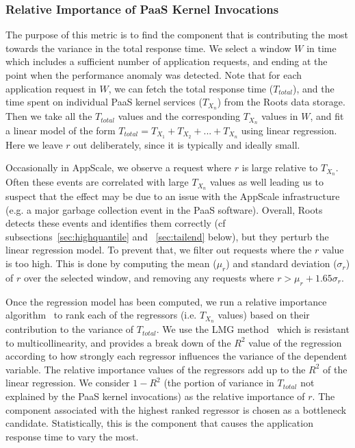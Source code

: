 \subsubsection{Relative Importance of PaaS Kernel Invocations} 
The purpose of this metric is to find the component that is contributing 
the most towards the variance in the total response time. 
We select a window $W$ in time which includes a sufficient number of application requests,
and ending at the point when the performance anomaly was detected. Note that for each application request
in $W$, we can fetch the total response time ($T_{total}$), and the time spent on individual PaaS kernel
services ($T_{X_n}$) from the Roots data storage.
Then we take all the $T_{total}$ values
and the corresponding $T_{X_n}$ values in $W$, and fit 
a linear model of the form 
$T_{total} = T_{X_1} + T_{X_2} + ... + T_{X_n}$
using linear regression. Here we leave $r$ out
deliberately, since it is typically and ideally small. 

Occasionally in AppScale, we observe a request where $r$ is
large relative to $T_{X_n}$.  Often these events are correlated with large
$T_{X_n}$ values as well leading us to suspect that the effect may be due to
an issue with the AppScale infrastructure (e.g. a major garbage collection
event in the PaaS software).  Overall, Roots detects these events and identifies them correctly (cf
subsections~\ref{sec:highquantile} and ~\ref{sec:tailend} below), but they
perturb the linear regression model.  To prevent that,
we filter out requests where the $r$ value is too high. This
is done by computing the mean ($\mu_r$) and standard deviation ($\sigma_r$) of $r$ 
over the selected window, and removing 
any requests where $r > \mu_r + 1.65\sigma_r$.

Once the regression model has been computed, we run a relative importance algorithm~\cite{JSSv017i01} to rank each of the
regressors (i.e. $T_{X_n}$ values) based on their contribution to the variance of $T_{total}$. 
We use the LMG method~\cite{lmg80} which is resistant to multicollinearity, and provides a break down of the $R^2$ value of
the regression according to how strongly each regressor influences the variance of the dependent variable.
The relative importance values of the regressors add up to the $R^2$ of the linear regression. We consider
$1 - R^2$ (the portion of variance in $T_{total}$ not explained by the PaaS kernel invocations) as the relative importance of $r$. 
The component associated with the highest ranked regressor is chosen as a bottleneck candidate.
Statistically, this is the component that causes the application response time to vary the most.

